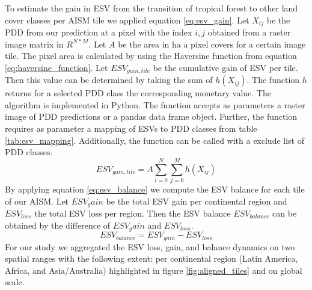 		To estimate the gain in \ac{ESV} from the transition of tropical forest to other land cover classes per \ac{AISM} tile we applied equation \ref{eq:esv_gain}. Let $X_{ij}$ be the \ac{PDD} from our prediction at a pixel with the index $i,j$ obtained from a raster image matrix in $R^{N*M}$. Let $A$ be the area in ha a pixel covers for a certain image tile. The pixel area is calculated by using the Haversine function from equation \ref{eq:haversine_function}. Let $ESV_{gain,tile}$ be the cumulative gain of \ac{ESV} per tile. Then this value can be determined by taking the sum of $h(X_{ij})$. The function $h$ returns for a selected \ac{PDD} class the corresponding monetary value. The algorithm is implemented in Python. The function accepts as parameters a raster image of \ac{PDD} predictions or a pandas data frame object. Further, the function requires as parameter a mapping of \acp{ESV} to \ac{PDD} classes from table \ref{tab:esv_mapping}. Additionally, the function can be called with a exclude list of \ac{PDD} classes.
		\begin{equation}
		\label{eq:esv_gain}
			ESV_{gain,tile} = A\displaystyle\sum_{i=0}^{N}\displaystyle\sum_{j=0}^{M} h(X_{ij})
		\end{equation}
		By applying equation \ref{eq:esv_balance} we compute the \ac{ESV} balance for each tile of our \ac{AISM}. Let $ESV_gain$ be the total \ac{ESV} gain per continental region and $ESV_{loss}$ the total \ac{ESV} loss per region. Then the \ac{ESV} balance $ESV_{balance}$ can be obtained by the difference of $ESV_gain$ and $ESV_{loss}$.
		\begin{equation}
		\label{eq:esv_balance}
			ESV_{balance} = ESV_{gain} - ESV_{loss}
		\end{equation}
		For our study we aggregated the \ac{ESV} loss, gain, and balance dynamics on two spatial ranges with the following extent: per continental region (Latin America, Africa, and Asia/Australia) highlighted in figure \ref{fig:aligned_tiles} and on global scale.


